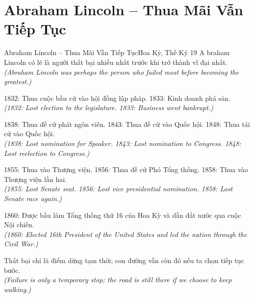 \section{Abraham Lincoln -- Thua Mãi Vẫn Tiếp Tục}
\begin{truyen}{Abraham Lincoln -- Thua Mãi Vẫn Tiếp Tục}{Hoa Kỳ, Thế Kỷ 19}
A braham Lincoln có lẽ là người thất bại nhiều nhất trước khi trở thành vĩ đại nhất.\\
\textit{(Abraham Lincoln was perhaps the person who failed most before becoming the greatest.)}

1832: Thua cuộc bầu cử vào hội đồng lập pháp. 1833: Kinh doanh phá sản.\\
\textit{(1832: Lost election to the legislature. 1833: Business went bankrupt.)}

1838: Thua đề cử phát ngôn viên. 1843: Thua đề cử vào Quốc hội. 1848: Thua tái cử vào Quốc hội.\\
\textit{(1838: Lost nomination for Speaker. 1843: Lost nomination to Congress. 1848: Lost reelection to Congress.)}

1855: Thua vào Thượng viện. 1856: Thua đề cử Phó Tổng thống. 1858: Thua vào Thượng viện lần hai.\\
\textit{(1855: Lost Senate seat. 1856: Lost vice presidential nomination. 1858: Lost Senate race again.)}

1860: Được bầu làm Tổng thống thứ 16 của Hoa Kỳ và dẫn đất nước qua cuộc Nội chiến.\\
\textit{(1860: Elected 16th President of the United States and led the nation through the Civil War.)}

\end{truyen}
\begin{baihoc}
  Thất bại chỉ là điểm dừng tạm thời; con đường vẫn còn đó nếu ta chọn tiếp tục bước.\\
  \textit{(Failure is only a temporary stop; the road is still there if we choose to keep walking.)}
\end{baihoc}

